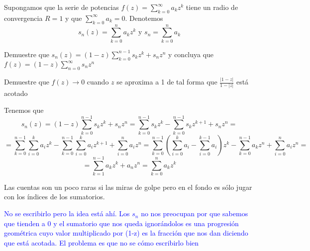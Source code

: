 \begin{problem}[20]
Supongamos que la serie de potencias $f(z)=\sum_{k=0}^{\infty}a_kz^k$ tiene un radio de convergencia $R=1$ y que $\sum_{k=0}^{\infty}a_k=0$. Denotemos
\[s_n(z)=\sum_{k=0}^n a_k z^k \text{  y  } s_n=\sum_{k=0}^na_k\]

\ppart Demuestre que $s_n(z)=(1-z)\sum_{k=0}^{n-1}s_kz^k+s_nz^n$ y concluya que $f(z)=(1-z)\sum_{n=0}^{\infty}s_nz^n$

\ppart Demuestre que $f(z) \to 0$ cuando $z$ se aproxima a 1 de tal forma que $\frac{|1-z|}{1-|z|}$ está acotado

\solution
{}

\spart
Tenemos que
\[s_n(z) = (1-z)\sum_{k=0}^{n-1}s_kz^k+s_nz^n = \sum_{k=0}^{n-1}s_kz^k -\sum_{k=0}^{n-1}s_kz^{k+1}+s_nz^n = \]
\[=\sum_{k=0}^{n-1}\sum_{i=0}^ka_iz^k -\sum_{k=0}^{n-1}\sum_{i=0}^ka_iz^{k+1}+\sum_{i=0}^na_iz^n = \sum_{k=0}^{n-1} \left( \sum_{i=0}^k a_i - \sum_{i=0}^{k-1} a_i\right) z^k - \sum_{k=0}^{n-1} a_kz^n + \sum_{i=0}^na_iz^n =\]
\[= \sum_{k=1}^{n-1} a_k z^k + a_nz^n = \sum_{k=0}^n a_k z^k\]

Las cuentas son un poco raras si las miras de golpe pero en el fondo es sólo jugar con los índices de los sumatorios.

\spart

\textcolor{blue}{No se escribirlo pero la idea está ahí. Los $s_n$ no nos preocupan por que sabemos que tienden a 0 y el sumatorio que nos queda ignorándolos es una progresión geométrica cuyo valor multiplicado por (1-z) es la fracción que nos dan diciendo que está acotada. El problema es que no se cómo escribirlo bien}

\end{problem}

